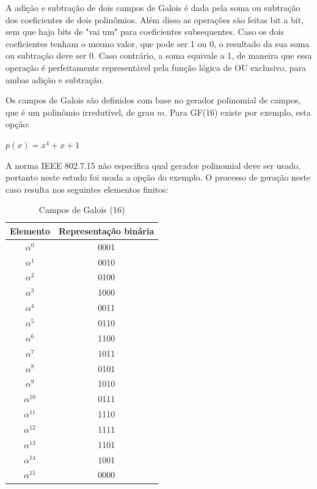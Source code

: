 	A adição e subtração de dois campos de Galois é dada pela soma ou subtração dos coeficientes de dois polinômios. Além disso as operações são feitas bit a bit, sem que haja bits de "vai um" para coeficientes subsequentes. Caso os dois coeficientes tenham o mesmo valor, que pode ser 1 ou 0, o resultado da sua soma ou subtração deve ser 0. Caso contrário, a soma equivale a 1, de maneira que essa operação é perfeitamente representável pela função lógica de OU exclusivo, para ambas adição e subtração.
	
	Os campos de Galois são definidos com base no gerador polinomial de campos, que é um polinômio irredutível, de grau $m$. Para GF(16) existe por exemplo, esta opção:
	
	$p(x) = x^{4} + x + 1 $
	
	
	A norma IEEE 802.7.15 não especifica qual gerador polinomial deve ser usado, portanto neste estudo foi usada a opção do exemplo. O processo de geração neste caso resulta nos seguintes elementos finitos:
	 
	\begin{table}[]
		\centering
		\caption{Campos de Galois (16)}
		\label{my-label}
		\begin{tabular}{|c|c|}
			\hline
			Elemento & Representação binária \\ \hline
			$\alpha^{0}$   & 0001                  \\ \hline
			$\alpha^{1}$   & 0010                  \\ \hline
			$\alpha^{2}$   & 0100                  \\ \hline
			$\alpha^{3}$   & 1000                  \\ \hline
			$\alpha^{4}$   & 0011                  \\ \hline
			$\alpha^{5}$   & 0110                  \\ \hline
			$\alpha^{6}$   & 1100                  \\ \hline
			$\alpha^{7}$   & 1011                  \\ \hline
			$\alpha^{8}$   & 0101                  \\ \hline
			$\alpha^{9}$   & 1010                  \\ \hline
			$\alpha^{10}$  & 0111                  \\ \hline
			$\alpha^{11}$  & 1110                  \\ \hline
			$\alpha^{12}$  & 1111                  \\ \hline
			$\alpha^{13}$  & 1101                  \\ \hline
			$\alpha^{14}$  & 1001                  \\ \hline
			$\alpha^{15}$  & 0000                  \\ \hline
		\end{tabular}
	\end{table}
	 
